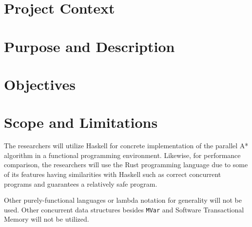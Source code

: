

\section{Project Context}

\section{Purpose and Description}

\section{Objectives}

\section{Scope and Limitations}
The researchers will utilize Haskell for concrete implementation 
of the parallel A* algorithm in a functional programming environment.
Likewise, for performance comparison, the researchers 
will use the Rust programming language due to some of its features having
similarities with Haskell such as correct concurrent programs\cite{Saligrama2019}
and guarantees a relatively safe program\cite{Jung2018}.

Other purely-functional languages or lambda notation for generality
will not be used. Other concurrent data structures besides \verb|MVar| and Software
Transactional Memory will not be utilized.